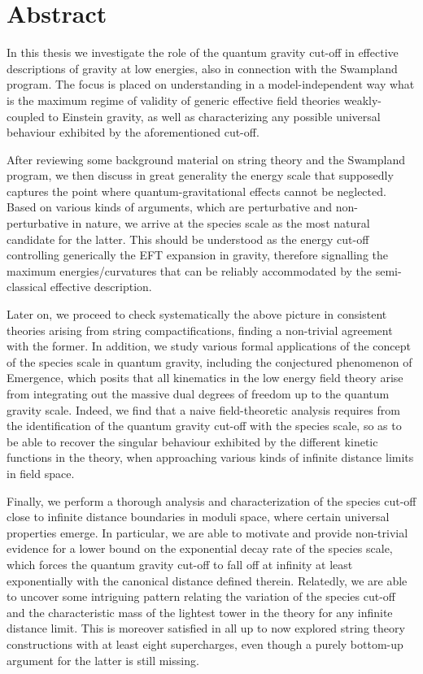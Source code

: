 \thispagestyle{empty}
\chapter*{Abstract}
\thispagestyle{empty}

In this thesis we investigate the role of the quantum gravity cut-off in effective descriptions of gravity at low energies, also in connection with the Swampland program. The focus is placed on understanding in a model-independent way what is the maximum regime of validity of generic effective field theories weakly-coupled to Einstein gravity, as well as characterizing any possible universal behaviour exhibited by the aforementioned cut-off. 

After reviewing some background material on string theory and the Swampland program, we then discuss in great generality the energy scale that supposedly captures the point where quantum-gravitational effects cannot be neglected. Based on various kinds of arguments, which are perturbative and non-perturbative in nature, we arrive at the species scale as the most natural candidate for the latter. This should be understood as the energy cut-off controlling generically the EFT expansion in gravity, therefore signalling the maximum energies/curvatures that can be reliably accommodated by the semi-classical effective description.

Later on, we proceed to check systematically the above picture in consistent theories arising from string compactifications, finding a non-trivial agreement with the former. In addition, we study various formal applications of the concept of the species scale in quantum gravity, including the conjectured phenomenon of Emergence, which posits that all kinematics in the low energy field theory arise from integrating out the massive dual degrees of freedom up to the quantum gravity scale. Indeed, we find that a naive field-theoretic analysis requires from the identification of the quantum gravity cut-off with the species scale, so as to be able to recover the singular behaviour exhibited by the different kinetic functions in the theory, when approaching various kinds of infinite distance limits in field space.

Finally, we perform a thorough analysis and characterization of the species cut-off close to infinite distance boundaries in moduli space, where certain universal properties emerge. In particular, we are able to motivate and provide non-trivial evidence for a lower bound on the exponential decay rate of the species scale, which forces the quantum gravity cut-off to fall off at infinity at least exponentially with the canonical distance defined therein. Relatedly, we are able to uncover some intriguing pattern relating the variation of the species cut-off and the characteristic mass of the lightest tower in the theory for any infinite distance limit. This is moreover satisfied in all up to now explored string theory constructions with at least eight supercharges, even though a purely bottom-up argument for the latter is still missing.




